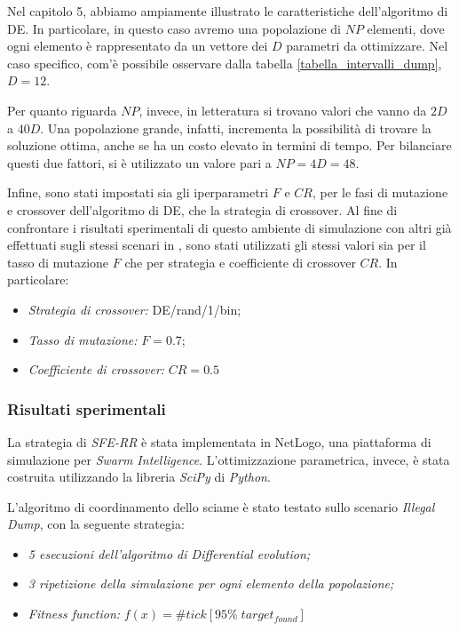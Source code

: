 Nel capitolo 5, abbiamo ampiamente illustrato le caratteristiche dell'algoritmo di DE.
In particolare, in questo caso avremo una popolazione di $NP$ elementi, dove ogni elemento è rappresentato da un vettore dei $D$ parametri da ottimizzare.
Nel caso specifico, com'è possibile osservare dalla tabella \ref{tabella_intervalli_dump}, $D=12$.

Per quanto riguarda $NP$, invece, in letteratura si trovano valori che vanno da $2D$ a $40D$.
Una popolazione grande, infatti, incrementa la possibilità di trovare la soluzione ottima, anche se ha un costo elevato in termini di tempo.
Per bilanciare questi due fattori, si è utilizzato un valore pari a $NP = 4D = 48$.

Infine, sono stati impostati sia gli iperparametri $F$ e $CR$, per le fasi di mutazione e crossover dell'algoritmo di DE, che la strategia di crossover.
Al fine di confrontare i risultati sperimentali di questo ambiente di simulazione con altri già effettuati sugli stessi scenari in \cite{cimino2019adaptive}, sono stati utilizzati gli stessi valori sia per il tasso di mutazione $F$ che per strategia e coefficiente di crossover $CR$.
In particolare:
\begin{itemize}
    \item \textit{Strategia di crossover:} DE/rand/1/bin;
    \item \textit{Tasso di mutazione:} $F=0.7$;
    \item \textit{Coefficiente di crossover:} $CR=0.5$
\end{itemize}

\subsubsection{Risultati sperimentali}

La strategia di \textit{SFE-RR} è stata implementata in NetLogo, una piattaforma di simulazione per \textit{Swarm Intelligence}.
L'ottimizzazione parametrica, invece, è stata costruita utilizzando la libreria \textit{SciPy} di \textit{Python}.

L'algoritmo di coordinamento dello sciame è stato testato sullo scenario \textit{Illegal Dump}, con la seguente strategia:
\begin{itemize}
    \item \textit{5 esecuzioni dell'algoritmo di Differential evolution;}
    \item \textit{3 ripetizione della simulazione per ogni elemento della popolazione;}
    \item \textit{Fitness function:} $f(x) = \# tick[95 \% \; target_{found}]$
\end{itemize}

